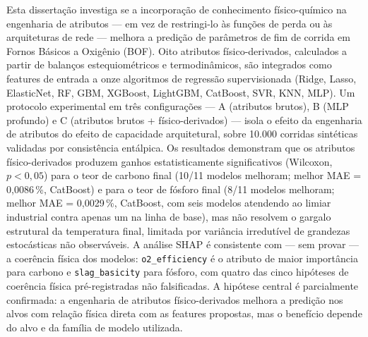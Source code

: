 \documentclass[openright]{normas-utf-tex} %
\begin{document}
\begin{resumo}
Esta dissertação investiga se a incorporação de conhecimento físico-químico na engenharia de atributos --- em vez de restringi-lo às funções de perda ou às arquiteturas de rede --- melhora a predição de parâmetros de fim de corrida em Fornos Básicos a Oxigênio (BOF). Oito atributos físico-derivados, calculados a partir de balanços estequiométricos e termodinâmicos, são integrados como features de entrada a onze algoritmos de regressão supervisionada (Ridge, Lasso, ElasticNet, RF, GBM, XGBoost, LightGBM, CatBoost, SVR, KNN, MLP). Um protocolo experimental em três configurações --- A (atributos brutos), B (MLP profundo) e C (atributos brutos + físico-derivados) --- isola o efeito da engenharia de atributos do efeito de capacidade arquitetural, sobre 10.000 corridas sintéticas validadas por consistência entálpica. Os resultados demonstram que os atributos físico-derivados produzem ganhos estatisticamente significativos (Wilcoxon, $p < 0{,}05$) para o teor de carbono final (10/11 modelos melhoram; melhor MAE = 0{,}0086\,\%, CatBoost) e para o teor de fósforo final (8/11 modelos melhoram; melhor MAE = 0{,}0029\,\%, CatBoost, com seis modelos atendendo ao limiar industrial contra apenas um na linha de base), mas não resolvem o gargalo estrutural da temperatura final, limitada por variância irredutível de grandezas estocásticas não observáveis. A análise SHAP é consistente com --- sem provar --- a coerência física dos modelos: \texttt{o2\_efficiency} é o atributo de maior importância para carbono e \texttt{slag\_basicity} para fósforo, com quatro das cinco hipóteses de coerência física pré-registradas não falsificadas. A hipótese central é parcialmente confirmada: a engenharia de atributos físico-derivados melhora a predição nos alvos com relação física direta com as features propostas, mas o benefício depende do alvo e da família de modelo utilizada.
\end{resumo}
\end{document}
